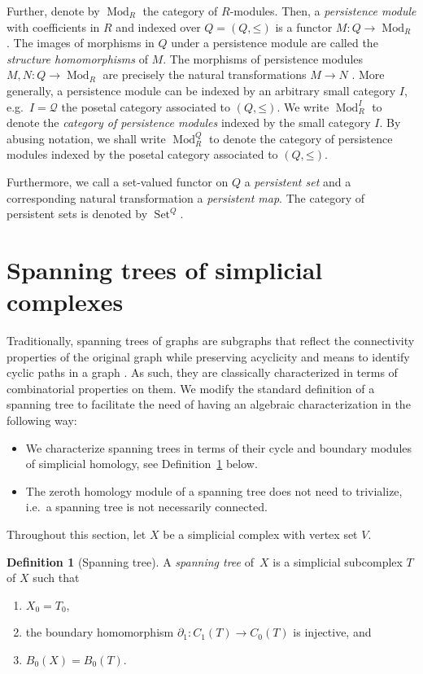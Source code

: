 \documentclass[oneside]{amsart}
\theoremstyle{definition}
\newtheorem{definition}[theorem]{Definition}
\newcommand\Set{\operatorname{Set}}
\newcommand\Mod[1]{\operatorname{Mod}_{#1}}
\begin{document}
Further, denote by $\Mod{R}$ the category of $R$-modules.
Then, a \emph{persistence module} with coefficients in $R$ and indexed over $Q = (Q, \mathord\leq)$ is a functor $M\colon Q \to \Mod{R}$.
The images of morphisms in $Q$ under a persistence module are called the \emph{structure homomorphisms} of $M$.
The morphisms of persistence modules $M, N\colon Q \to \Mod{R}$ are precisely the natural transformations $M \to N$ .
More generally, a persistence module can be indexed by an arbitrary small category $I$, e.g.\ $I = \mathcal Q$ the posetal category associated to $(Q, \mathord\leq)$.
We write $\Mod{R}^I$ to denote the \emph{category of persistence modules} indexed by the small category $I$.
By abusing notation, we shall write $\Mod{R}^Q$ to denote the category of persistence modules indexed by the posetal category associated to $(Q, \mathord\leq)$.

Furthermore, we call a set-valued functor on $Q$ a \emph{persistent set} and a corresponding natural transformation a \emph{persistent map}.
The category of persistent sets is denoted by $\Set^Q$.

\section{Spanning trees of simplicial complexes}%
\label{section:SpanningTrees}

Traditionally, spanning trees of graphs are subgraphs that reflect the connectivity properties of the original graph while preserving acyclicity and means to identify cyclic paths in a graph \cite{BondyMurty2008,Kozlov2020,Lovász1977}.
As such, they are classically characterized in terms of combinatorial properties on them.
We modify the standard definition of a spanning tree to facilitate the need of having an algebraic characterization in the following way:
\begin{itemize}
    \item We characterize spanning trees in terms of their cycle and boundary modules of simplicial homology, see Definition~\ref{definition:SpanningTree} below.
    \item The zeroth homology module of a spanning tree does not need to trivialize, i.e.\ a spanning tree is not necessarily connected.
\end{itemize}

Throughout this section, let $X$ be a simplicial complex with vertex set $V$.

\begin{definition}[Spanning tree]%
    \label{definition:SpanningTree}
    A \emph{spanning tree} of~$X$ is a simplicial subcomplex $T$ of $X$ such that
    \begin{enumerate}[label=(\roman*)]
        \item\label{definition:SpanningTree:c1} $X_0 = T_0$,
        \item\label{definition:SpanningTree:c2} the boundary homomorphism $\partial_1\colon C_1(T) \to C_0(T)$ is injective, and
        \item\label{definition:SpanningTree:c3} $B_0(X) = B_0(T)$.
    \end{enumerate}
\end{definition}
\end{document}
